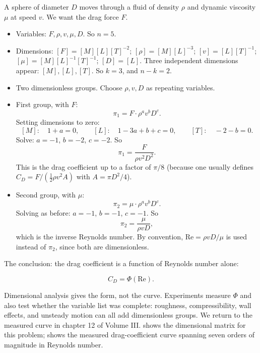 A sphere of diameter $D$ moves through a fluid of density $\rho$ and
dynamic viscosity $\mu$ at speed $v$. We want the drag force $F$.

\begin{itemize}[leftmargin=*]
  \item Variables: $F, \rho, v, \mu, D$. So $n = 5$.
  \item Dimensions: $[F] = [M][L][T]^{-2}$; $[\rho] = [M][L]^{-3}$;
    $[v] = [L][T]^{-1}$; $[\mu] = [M][L]^{-1}[T]^{-1}$; $[D] = [L]$.
    Three independent dimensions appear: $[M], [L], [T]$. So $k =
    3$, and $n - k = 2$.
  \item Two dimensionless groups. Choose $\rho, v, D$ as repeating
    variables.
  \item First group, with $F$:
    \[
    \pi_{1} = F \cdot \rho^{a} v^{b} D^{c}.
    \]
    Setting dimensions to zero:
    \[
    [M]: \quad 1 + a = 0, \qquad
    [L]: \quad 1 - 3a + b + c = 0, \qquad
    [T]: \quad -2 - b = 0.
    \]
    Solve: $a = -1$, $b = -2$, $c = -2$. So
    \[
    \pi_{1} = \frac{F}{\rho v^{2} D^{2}}.
    \]
    This is the drag coefficient up to a factor of $\pi/8$ (because
    one usually defines $C_{D} = F / (\tfrac{1}{2} \rho v^{2} A)$
    with $A = \pi D^{2}/4$).
  \item Second group, with $\mu$:
    \[
    \pi_{2} = \mu \cdot \rho^{a} v^{b} D^{c}.
    \]
    Solving as before: $a = -1$, $b = -1$, $c = -1$. So
    \[
    \pi_{2} = \frac{\mu}{\rho v D},
    \]
    which is the inverse Reynolds number. By convention, $\mathrm{Re}
    = \rho v D / \mu$ is used instead of $\pi_{2}$, since both are
    dimensionless.
\end{itemize}

The conclusion: the drag coefficient is a function of Reynolds number
alone:

\[
C_{D} = \Phi(\mathrm{Re}).
\]

Dimensional analysis gives the form, not the curve. Experiments
measure $\Phi$ and also test whether the variable list was complete:
roughness, compressibility, wall effects, and unsteady motion can all
add dimensionless groups. We return to the measured curve in chapter
12 of Volume III.  shows the
dimensional matrix for this problem; 
shows the measured drag-coefficient curve spanning seven orders of
magnitude in Reynolds number.





